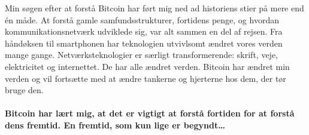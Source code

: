 \documentclass[paper=6in:9in,pagesize=pdftex,
               headinclude=on,footinclude=on,12pt]{scrbook}
\begin{document}
Min søgen efter at forstå Bitcoin har ført mig ned ad historiens stier på mere end \'en måde. At forstå gamle samfundsstrukturer, fortidens penge, og hvordan kommunikationsnetværk udviklede sig, var alt sammen en del af rejsen. Fra håndøksen til smartphonen har teknologien utvivlsomt ændret vores verden mange gange. Netværksteknologier er særligt transformerende: skrift, veje, elektricitet og internettet. De har alle ændret verden. Bitcoin har ændret min verden og vil fortsætte med at ændre tankerne og hjerterne hos dem, der tør bruge den.\paragraph{Bitcoin har lært mig, at det er vigtigt at forstå fortiden for at forstå dens fremtid. En fremtid, som kun lige er begyndt\ldots}%
%
%
%
%
%
\end{document}
